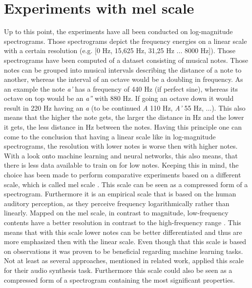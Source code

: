 \section{Experiments with mel scale}
\label{sec:exp_mel}
Up to this point, the experiments have all been conducted on log-magnitude spectrograms. Those spectrograms depict the frequency energies on a linear scale with a certain resolution (e.g. [0 Hz, 15,625 Hz, 31,25 Hz ... 8000 Hz]). Those spectrograms have been computed of a dataset consisting of musical notes. Those notes can be grouped into musical intervals describing the distance of a note to another, whereas the interval of an octave would be a doubling in frequency. As an example the note \textit{a'} has a frequency of 440 Hz (if perfect sine), whereas its octave on top would be an \textit{a''} with 880 Hz. If going an octave down it would result in 220 Hz having an \textit{a} (to be continued \textit{A} 110 Hz, \textit{A'} 55 Hz, ...). This also means that the higher the note gets, the larger the distance in Hz and the lower it gets, the less distance in Hz between the notes. Having this principle one can come to the conclusion that having a linear scale like in log-magnitude spectrograms, the resolution with lower notes is worse then with higher notes. With a look onto machine learning and neural networks, this also means, that there is less data available to train on for low notes.
Keeping this in mind, the choice has been made to perform comparative experiments based on a different scale, which is called mel scale \cite{stevens1937scale}. This scale can be seen as a compressed form of a spectrogram. Furthermore it is an empirical scale that is based on the human auditory perception, as they perceive frequency logarithmically rather than linearly. Mapped on the mel scale, in contrast to magnitude, low-frequency contents have a better resolution in contrast to the high-frequency range \cite{Kathania2019}. This means that with this scale lower notes can be better differentiated and thus are more emphasized then with the linear scale. Even though that this scale is based on observations it was proven to be beneficial regarding machine learning tasks. Not at least as several approaches, mentioned in related work, applied this scale for their audio synthesis task. Furthermore this scale could also be seen as a compressed form of a spectrogram containing the most significant properties. 

